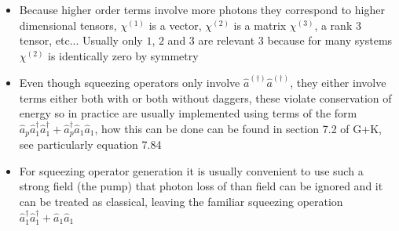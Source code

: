 \documentclass[english]{article}
\begin{document}
\begin{itemize}
\item Because higher order terms involve more photons they correspond to higher dimensional tensors, $\chi^{(1)}$ is a vector, $\chi^{(2)}$ is a matrix $\chi^{(3)}$, a rank 3 tensor, etc... Usually only $1$, $2$ and $3$ are relevant $3$ because for many systems $\chi^{(2)}$ is identically zero by symmetry
\item Even though squeezing operators only involve $\hat{a}^{(\dagger)}\hat{a}^{(\dagger)}$, they either involve terms either both with or both without daggers, these violate conservation of energy so in practice are usually implemented using terms of the form $\hat{a}_p\hat{a}_1^{\dagger}\hat{a}_1^{\dagger}+\hat{a}^\dagger_p\hat{a}_1\hat{a}_1$, how this can be done can be found in  section 7.2 of G+K, see particularly equation 7.84
\item For squeezing operator generation it is usually convenient to use such a strong field (the pump) that photon loss of than field can be ignored and it can be treated as classical, leaving the familiar squeezing operation $\hat{a}_1^{\dagger}\hat{a}_1^{\dagger}+\hat{a}_1\hat{a}_1$
\end{itemize}
\end{document}
